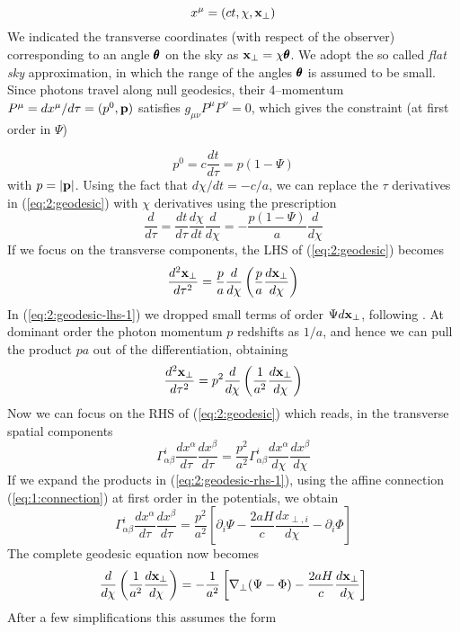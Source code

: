 \begin{equation}
\label{eq:2:coord}
x^{\mu} = (ct,\chi,\mathbf{x}_\perp)
\end{equation}
%
We indicated the transverse coordinates (with respect of the observer) corresponding to an angle $\pmb{\theta}$ on the sky as $\mathbf{x}_\perp=\chi\pmb{\theta}$. We adopt the so called \textit{flat sky} approximation, in which the range of the angles $\pmb{\theta}$ is assumed to be small. Since photons travel along null geodesics, their 4--momentum $P^\mu=dx^\mu/d\tau=(p^0,\mathbf{p})$ satisfies $g_{\mu\nu}P^{\mu}P^{\nu}=0$, which gives the constraint (at first order in $\Psi$)

\begin{equation}
\label{eq:2:nullconstr}
p^0 = c\frac{dt}{d\tau} = p(1-\Psi)
\end{equation} 
%
with $p=\vert\mathbf{p}\vert$. Using the fact that $d\chi/dt = -c/a$, we can replace the $\tau$ derivatives in (\ref{eq:2:geodesic}) with $\chi$ derivatives using the prescription
\begin{equation}
\label{eq:2:tau2chi}
\frac{d}{d\tau} = \frac{dt}{d\tau}\frac{d\chi}{dt}\frac{d}{d\chi} = -\frac{p(1-\Psi)}{a}\frac{d}{d\chi}
\end{equation}
%
If we focus on the transverse components, the LHS of (\ref{eq:2:geodesic}) becomes
\begin{equation}
\label{eq:2:geodesic-lhs-1}
\frac{d^2\mathbf{x}_\perp}{d\tau^2} = \frac{p}{a}\frac{d}{d\chi}\left(\frac{p}{a}\frac{d\mathbf{x}_\perp}{d\chi}\right)
\end{equation}
%
In (\ref{eq:2:geodesic-lhs-1}) we dropped small terms of order $\Psi d\mathbf{x}_\perp$, following \citep{Dodelson-C11}. At dominant order the photon momentum $p$ redshifts as $1/a$, and hence we can pull the product $pa$ out of the differentiation, obtaining 
\begin{equation}
\label{eq:2:geodesic-lhs-2}
\frac{d^2\mathbf{x}_\perp}{d\tau^2} = p^2\frac{d}{d\chi}\left(\frac{1}{a^2}\frac{d\mathbf{x}_\perp}{d\chi}\right)
\end{equation}
%
Now we can focus on the RHS of (\ref{eq:2:geodesic}) which reads, in the transverse spatial components
\begin{equation}
\label{eq:2:geodesic-rhs-1}
\Gamma_{\alpha\beta}^i \frac{d x^\alpha}{d\tau}\frac{d x^\beta}{d\tau} = \frac{p^2}{a^2} \Gamma_{\alpha\beta}^i \frac{d x^\alpha}{d\chi}\frac{d x^\beta}{d\chi}
\end{equation}
%
If we expand the products in (\ref{eq:2:geodesic-rhs-1}), using the affine connection (\ref{eq:1:connection}) at first order in the potentials, we obtain
\begin{equation}
\label{eq:2:geodesic-rhs-2}
\Gamma_{\alpha\beta}^i \frac{d x^\alpha}{d\tau}\frac{d x^\beta}{d\tau} = \frac{p^2}{a^2}\left[\partial_i\Psi-\frac{2aH}{c}\frac{dx_{\perp,i}}{d\chi} -\partial_i\Phi \right]
\end{equation}
%
The complete geodesic equation now becomes 
\begin{equation}
\label{eq:2:geodesic-fo-1}
\frac{d}{d\chi}\left(\frac{1}{a^2}\frac{d\mathbf{x}_\perp}{d\chi}\right) = -\frac{1}{a^2}\left[\nabla_\perp(\Psi-\Phi)-\frac{2aH}{c}\frac{d\mathbf{x}_\perp}{d\chi}\right]
\end{equation}
%
After a few simplifications this assumes the form 


